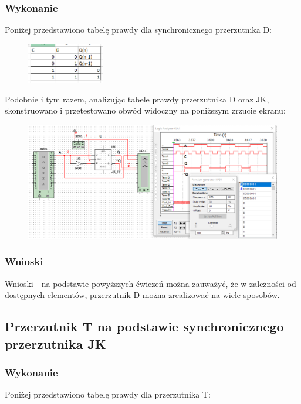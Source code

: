\documentclass[12pt,a4paper]{article}
\begin{document}
\subsubsection{Wykonanie}
Poniżej przedstawiono tabelę prawdy dla synchronicznego przerzutnika D:
\begin{figure}[H]
\centering
\includegraphics[width=0.3\textwidth]{img/3dTruthTable}
\end{figure}

Podobnie i tym razem, analizując tabele prawdy przerzutnika D oraz JK, skonstruowano i przetestowano obwód widoczny na poniższym zrzucie ekranu:

\begin{figure}[H]
\centering
\includegraphics[width=\textwidth]{img/3f}
\end{figure}

\subsubsection{Wnioski}
Wnioski - na podstawie powyższych ćwiczeń można zauważyć, że w zależności od dostępnych elementów, przerzutnik D można zrealizować na wiele sposobów.


\subsection{Przerzutnik T na podstawie synchronicznego przerzutnika JK}
\subsubsection{Wykonanie}
Poniżej przedstawiono tabelę prawdy dla przerzutnika T:
\end{document}
